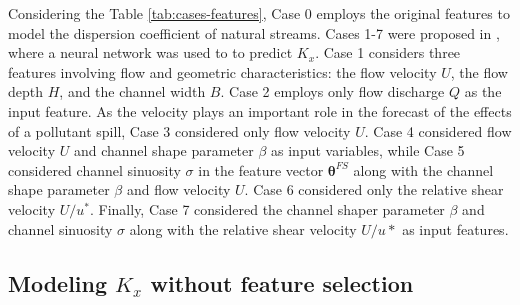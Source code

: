 \documentclass[a4paper,12pt, english]{article}
\newcommand{\xp}{\bm{\theta}}
\newcommand{\xfs}{\xp^{FS}}
\begin{document}
Considering the Table  \ref{tab:cases-features}, 
Case 0  employs the original features to model the dispersion coefficient of natural streams.
Cases 1-7 were proposed in \cite{tayfur2005predicting}, where a neural network was used to to predict $K_x$.
Case 1  considers three features involving flow and geometric characteristics: the flow velocity $U$, the flow depth $H$, and the channel width $B$.
Case 2 employs only flow discharge $Q$ as the input feature.
As the velocity plays an important role in the forecast of the effects of a pollutant spill, Case 3  considered only flow velocity $U$.
Case 4 considered flow velocity $U$ and channel shape parameter $\beta$ as input variables, while Case 5 considered channel sinuosity $\sigma$ in the feature vector $\xfs$ along with the channel shape parameter $\beta$ and flow velocity $U$.
Case 6 considered only the relative shear velocity $U/u^*$.
Finally, Case 7 considered the channel shaper parameter $\beta$ and channel sinuosity $\sigma$ along with the relative shear velocity $U/u*$ as input features.

% 



\subsection{\label{sec:ldc-nfs} Modeling $K_x$ without feature selection }
\end{document}
